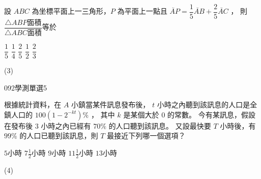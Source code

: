 \begin{QUESTIONS}
\begin{QUESTION}
        \begin{QBODY}
            設 $ABC$ 為坐標平面上一三角形，$P$ 為平面上一點且 $\lvec{AP} = \dfrac{1}{5} \lvec{AB} + \dfrac{2}{5} \lvec{AC}$ ， 則 $\dfrac{\triangle ABP \mbox{面積}}{ \triangle ABC \mbox{面積}}$等於 
            \begin{QOPS}
                \QOP $\dfrac{1}{5}$ 
                \QOP $\dfrac{1}{4}$ 
                \QOP $\dfrac{2}{5}$ 
                \QOP $\dfrac{1}{2}$         
                \QOP $\dfrac{2}{3}$
            \end{QOPS}
        \end{QBODY}
        \begin{QFROMS}
        \end{QFROMS}
        \begin{QTAGS}\end{QTAGS}
        \begin{QANS}
            (3)
        \end{QANS}
        \begin{QSOLLIST}
        \end{QSOLLIST}
        \begin{QEMPTYSPACE}
        \end{QEMPTYSPACE}
    \end{QUESTION}
    \begin{QUESTION}
        \begin{ExamInfo}{092}{學測}{單選}{5}
        \end{ExamInfo}
        \begin{ExamAnsRateInfo}{22}{43}{15}{8}
        \end{ExamAnsRateInfo}
        \begin{QBODY}
            根據統計資料，在  $A$ 小鎮當某件訊息發布後， 
            $t$ 小時之內聽到該訊息的人口是全鎮人口的 $100(1- 2^{-kt})\%$ ，
            其中 $k$ 是某個大於 $0$ 的常數。
            今有某訊息，假設在發布後 $3$ 小時之內已經有 $70\%$ 的人口聽到該訊息。
            又設最快要 $T$ 小時後，有 $99\%$ 的人口已聽到該訊息，則 $T$ 最接近下列哪一個選項？
            \begin{QOPS} 
                \QOP $5$小時        
                \QOP $7\frac{1}{2}$小時
                \QOP $9$小時 
                \QOP $11\frac{1}{2}$小時 
                \QOP $13$小時
            \end{QOPS}
        \end{QBODY}
        \begin{QFROMS}
        \end{QFROMS}
        \begin{QTAGS}\end{QTAGS}
        \begin{QANS}
            (4)
        \end{QANS}
        \begin{QSOLLIST}
        \end{QSOLLIST}
        \begin{QEMPTYSPACE}
        \end{QEMPTYSPACE}
    \end{QUESTION}
\end{QUESTIONS}
